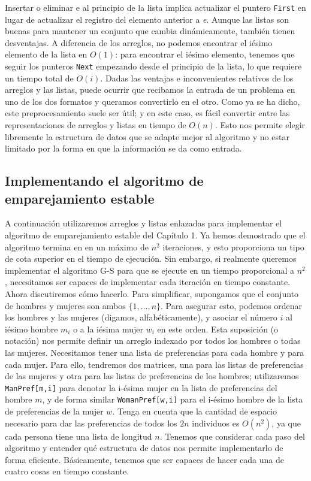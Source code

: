 \documentclass[a4paper, 12pt]{book}
\theoremstyle{dotless}
\begin{document}
Insertar o eliminar e al principio de la lista implica actualizar el puntero \texttt{First} en lugar de actualizar el registro del elemento anterior a \textit{e}.
Aunque las listas son buenas para mantener un conjunto que cambia dinámicamente, también tienen desventajas. A diferencia de los arreglos, no podemos encontrar el iésimo elemento de la lista en $O(1)$: para encontrar el iésimo elemento, tenemos que seguir los punteros \texttt{Next} empezando desde el principio de la lista, lo que requiere un tiempo total de $O(i)$. Dadas las ventajas e inconvenientes relativos de los arreglos y las listas, puede ocurrir que recibamos la entrada de un problema en uno de los dos formatos y queramos convertirlo en el otro. Como ya se ha dicho, este preprocesamiento suele ser útil; y en este caso, es fácil convertir entre las representaciones de arreglos y listas en tiempo de $O(n)$. Esto nos permite elegir libremente la estructura de datos que se adapte mejor al algoritmo y no estar limitado por la forma en que la información se da como entrada.

\subsection*{Implementando el algoritmo de emparejamiento estable}

A continuación utilizaremos arreglos y listas enlazadas para implementar el algoritmo de emparejamiento estable
del Capítulo 1. Ya hemos demostrado que el algoritmo termina en en un máximo de $n^2$ iteraciones, y esto proporciona un tipo de cota superior en el tiempo de ejecución. Sin embargo, si realmente queremos implementar el algoritmo G-S para que se ejecute en un tiempo proporcional a $n^2$, necesitamos ser capaces de implementar cada iteración en tiempo constante. Ahora discutiremos cómo hacerlo. 
Para simplificar, supongamos que el conjunto de hombres y mujeres son ambos $\{1, \dots , n\}$.
Para asegurar esto, podemos ordenar los hombres y las mujeres (digamos, alfabéticamente), y asociar el número $i$ al iésimo hombre $m_i$ o a la iésima mujer $w_i$ en este orden. 
Esta suposición (o notación) nos permite definir un arreglo indexado por todos los hombres o todas las mujeres. Necesitamos tener una lista de preferencias para cada hombre y para cada mujer. Para ello, tendremos dos matrices, una para las listas de preferencias de las mujeres y otra para las listas de preferencias de los hombres; utilizaremos \texttt{ManPref[m,i]} para denotar la i-ésima mujer en la lista de preferencias del hombre $m$, y de forma similar \texttt{WomanPref[w,i]} para el i-ésimo hombre de la lista de preferencias de la mujer $w$. Tenga en cuenta que la cantidad de espacio necesario para dar las preferencias de todos los $2n$ individuos es $O(n^2)$, ya que cada persona tiene una lista de longitud $n$.
Tenemos que considerar cada paso del algoritmo y entender qué estructura de datos nos permite implementarlo de forma eficiente. Básicamente, tenemos que ser capaces de hacer cada una de cuatro cosas en tiempo constante.
\end{document}
